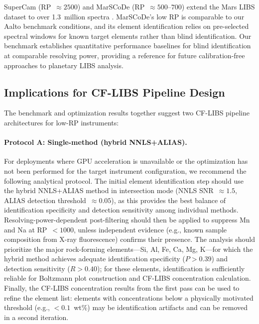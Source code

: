 SuperCam (RP~$\approx 2500$) and MarSCoDe (RP~$\approx 500$--$700$) extend the Mars LIBS dataset to over 1.3~million spectra \citep{Wiens2025}.
MarSCoDe's low RP is comparable to our Aalto benchmark conditions, and its element identification relies on pre-selected spectral windows for known target elements rather than blind identification.
Our benchmark establishes quantitative performance baselines for blind identification at comparable resolving power, providing a reference for future calibration-free approaches to planetary LIBS analysis.

\subsection{Implications for CF-LIBS Pipeline Design}

The benchmark and optimization results together suggest two CF-LIBS pipeline architectures for low-RP instruments:

\paragraph{Protocol A: Single-method (hybrid NNLS+ALIAS).}
For deployments where GPU acceleration is unavailable or the optimization has not been performed for the target instrument configuration, we recommend the following analytical protocol.
The initial element identification step should use the hybrid NNLS+ALIAS method in intersection mode (NNLS SNR~$\approx 1.5$, ALIAS detection threshold~$\approx 0.05$), as this provides the best balance of identification specificity and detection sensitivity among individual methods.
Resolving-power-dependent post-filtering should then be applied to suppress Mn and Na at RP~$< 1000$, unless independent evidence (e.g., known sample composition from X-ray fluorescence) confirms their presence.
The analysis should prioritize the major rock-forming elements---Si, Al, Fe, Ca, Mg, K---for which the hybrid method achieves adequate identification specificity ($P > 0.39$) and detection sensitivity ($R > 0.40$); for these elements, identification is sufficiently reliable for Boltzmann plot construction and CF-LIBS concentration calculation.
Finally, the CF-LIBS concentration results from the first pass can be used to refine the element list: elements with concentrations below a physically motivated threshold (e.g., $< 0.1$~wt\%) may be identification artifacts and can be removed in a second iteration.

